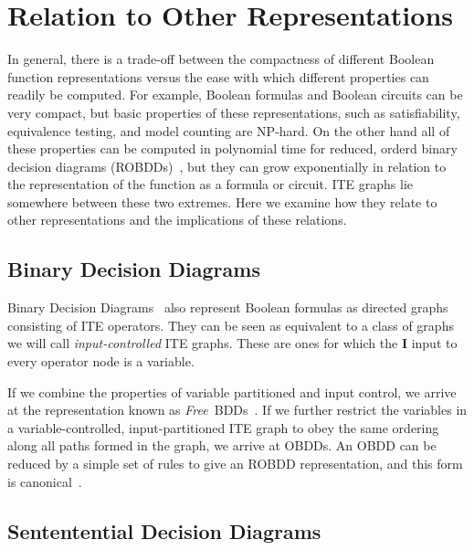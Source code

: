 \documentclass{llncs}
\newcommand{\ifarg}{\textbf{I}}
\begin{document}
\section{Relation to Other Representations}

In general, there is a trade-off between the compactness of different
Boolean function representations versus the ease with which different
properties can readily be computed.  For example, Boolean formulas and
Boolean circuits can be very compact, but basic properties of these
representations, such as satisfiability, equivalence testing, and
model counting are NP-hard.  On the other hand all of these properties
can be computed in polynomial time for reduced, orderd binary decision
diagrams (ROBDDs)~\cite{Bryant:1986}, but they can grow exponentially
in relation to the representation of the function as a formula or
circuit.  ITE graphs lie somewhere between these two extremes.  Here
we examine how they relate to other representations and the implications
of these relations.

\subsection{Binary Decision Diagrams}

Binary Decision Diagrams~\cite{akers:ieeetc:1978} also represent Boolean formulas
as directed graphs consisting of ITE operators.  They can be seen as
equivalent to a class of graphs we will call {\em input-controlled} ITE
graphs.  These are ones for which the \ifarg{} input to every operator
node is a variable.

If we combine the properties of variable partitioned and input
control, we arrive at the representation known as {\em
  Free}~BDDs~\cite{gergov:ieeetc:1994}.  If we further restrict the
variables in a variable-controlled, input-partitioned ITE graph to
obey the same ordering along all paths formed in the graph, we arrive
at OBDDs.  An OBDD can be reduced by a simple set of rules to give an
ROBDD representation, and this form is canonical~\cite{Bryant:1986}.

\subsection{Sententential Decision Diagrams}
\end{document}
